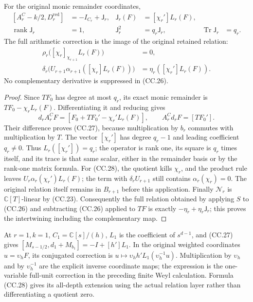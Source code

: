 \begin{theorem}
For the original monic remainder coordinates,
\[
 \begin{aligned}
 [A_r^C-k/2,D_r^{\mathrm{red}}]
    &=-I_{C_r}+\mathsf J_r,&
 \mathsf J_r(F)&=[\chi_r']L_r(F),\\
 \operatorname{rank}\mathsf J_r&=1,&
 \mathsf J_r^2&=q_r\mathsf J_r,&
 \operatorname{Tr}\mathsf J_r&=q_r.
 \end{aligned}\tag{CC.27}
\]
The full arithmetic correction is the image of the original retained
relation:
\[
 \begin{aligned}
 \rho_r\bigl([\chi_r]_{\chi_{r+1}}L_r(F)\bigr)&=0,\\
 \delta_r\bigl(U_{r+1}\alpha_{r+1}([\chi_r]L_r(F))\bigr)
    &=\eta_r([\chi_r']L_r(F)).
 \end{aligned}\tag{CC.28}
\]
No complementary derivative is suppressed in (CC.26).
\end{theorem}
\begin{proof}
Since \(TF_0\) has degree at most \(q_r\), its exact monic remainder is
\(TF_0-\chi_r L_r(F)\).  Differentiating it and reducing gives
\[
 d_r A_r^C F=[F_0+TF_0'-\chi_r'L_r(F)],\qquad
 A_r^C d_r F=[TF_0'].
\]
Their difference proves (CC.27), because multiplication by \(b_r\)
commutes with multiplication by \(T\).  The vector \([\chi_r']\)
has degree \(q_r-1\) and leading coefficient \(q_r\ne0\).
Thus \(L_r([\chi_r'])=q_r\); the operator is rank one, its square
is \(q_r\) times itself, and its trace is that same scalar, either
in the remainder basis or by the rank-one matrix formula.
For (CC.28), the quotient kills \(\chi_r\), and the product rule
leaves \(U_r\alpha_r(\chi_r')L_r(F)\); the term with
\(\delta_rU_{r+1}\) still contains \(\alpha_r(\chi_r)=0\).
The original relation itself remains in \(B_{r+1}\) before this
application.  Finally \(\mathcal N_r\) is \(\mathbb C[T]\)-linear
by (CC.23).  Consequently the full relation obtained by applying
\(S\) to (CC.26) and subtracting (CC.26) applied to \(TF\) is
exactly \(-\eta_r+\eta_r\mathsf J_r\); this proves the intertwining
including the complementary map.
\end{proof}

At \(r=1,k=1\), \(C_1=\mathbb C[s]/(h)\),
\(L_1\) is the coefficient of \(s^{d-1}\), and (CC.27) gives
\([M_{s-1/2},d_1+M_{b_1}]=-I+[h']L_1\).
In the original weighted coordinates \(u=\upsilon_h F\), its
conjugated correction is
\(u\mapsto\upsilon_h h' L_1(\upsilon_h^{-1}u)\).
Multiplication by \(\upsilon_h\) and by \(\upsilon_h^{-1}\)
are the explicit inverse coordinate maps; the expression is the
one-variable full-unit correction in the preceding finite Weyl
calculation.  Formula (CC.28) gives its all-depth extension using
the actual relation layer rather than differentiating a quotient zero.

